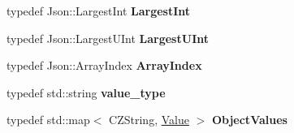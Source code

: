 \begin{DoxyCompactItemize}
\mbox{\label{classJson_1_1Value_a1cbb82642ed05109b9833e49f042ece7}} 
typedef Json\+::\+Largest\+Int {\bfseries Largest\+Int}
\item 
\mbox{\label{classJson_1_1Value_a6682a3684d635e03fc06ba229fa24eec}} 
typedef Json\+::\+Largest\+U\+Int {\bfseries Largest\+U\+Int}
\item 
\mbox{\label{classJson_1_1Value_a184a91566cccca7b819240f0d5561c7d}} 
typedef Json\+::\+Array\+Index {\bfseries Array\+Index}
\item 
\mbox{\label{classJson_1_1Value_a9e071ef3c135a2c9602e893b6005d0f7}} 
typedef std\+::string {\bfseries value\+\_\+type}
\item 
\mbox{\label{classJson_1_1Value_a08b6c80c3af7071d908dabf044de5388}} 
typedef std\+::map$<$ C\+Z\+String, \hyperlink{classJson_1_1Value}{Value} $>$ {\bfseries Object\+Values}
\end{DoxyCompactItemize}
